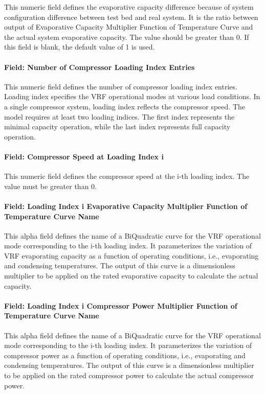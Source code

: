This numeric field defines the evaporative capacity difference because of system configuration difference between test bed and real system. It is the ratio between output of Evaporative Capacity Multiplier Function of Temperature Curve and the actual system evaporative capacity. The value should be greater than 0. If this field is blank, the default value of 1 is used.

\paragraph{Field: Number of Compressor Loading Index Entries}

This numeric field defines the number of compressor loading index entries. Loading index specifies the VRF operational modes at various load conditions. In a single compressor system, loading index reflects the compressor speed. The model requires at least two loading indices. The first index represents the minimal capacity operation, while the last index represents full capacity operation.

\paragraph{Field: Compressor Speed at Loading Index i}

This numeric field defines the compressor speed at the i-th loading index. The value must be greater than 0.

\paragraph{Field: Loading Index i Evaporative Capacity Multiplier Function of Temperature Curve Name}

This alpha field defines the name of a BiQuadratic curve for the VRF operational mode corresponding to the i-th loading index. It parameterizes the variation of VRF evaporating capacity as a function of operating conditions, i.e., evaporating and condensing temperatures. The output of this curve is a dimensionless multiplier to be applied on the rated evaporative capacity to calculate the actual capacity.

\paragraph{Field: Loading Index i Compressor Power Multiplier Function of Temperature Curve Name}

This alpha field defines the name of a BiQuadratic curve for the VRF operational mode corresponding to the i-th loading index. It parameterizes the variation of compressor power as a function of operating conditions, i.e., evaporating and condensing temperatures. The output of this curve is a dimensionless multiplier to be applied on the rated compressor power to calculate the actual compressor power.

